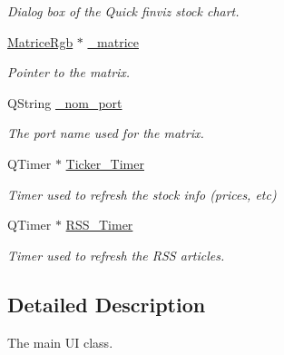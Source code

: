 \begin{DoxyCompactItemize}
\begin{DoxyCompactList}\small\item\em Dialog box of the Quick finviz stock chart. \end{DoxyCompactList}\item 
\hypertarget{class_t_k_r_t_a_p_a5cfe8b9a7354e3b2d2bf13380e1bca10}{\hyperlink{class_matrice_rgb}{Matrice\+Rgb} $\ast$ \hyperlink{class_t_k_r_t_a_p_a5cfe8b9a7354e3b2d2bf13380e1bca10}{\+\_\+matrice}}\label{class_t_k_r_t_a_p_a5cfe8b9a7354e3b2d2bf13380e1bca10}

\begin{DoxyCompactList}\small\item\em Pointer to the matrix. \end{DoxyCompactList}\item 
\hypertarget{class_t_k_r_t_a_p_a70b9df534de6fd98d382d19d2187c081}{Q\+String \hyperlink{class_t_k_r_t_a_p_a70b9df534de6fd98d382d19d2187c081}{\+\_\+nom\+\_\+port}}\label{class_t_k_r_t_a_p_a70b9df534de6fd98d382d19d2187c081}

\begin{DoxyCompactList}\small\item\em The port name used for the matrix. \end{DoxyCompactList}\item 
\hypertarget{class_t_k_r_t_a_p_afac0c2f9700ac220009573a74688f773}{Q\+Timer $\ast$ \hyperlink{class_t_k_r_t_a_p_afac0c2f9700ac220009573a74688f773}{Ticker\+\_\+\+Timer}}\label{class_t_k_r_t_a_p_afac0c2f9700ac220009573a74688f773}

\begin{DoxyCompactList}\small\item\em Timer used to refresh the stock info (prices, etc) \end{DoxyCompactList}\item 
\hypertarget{class_t_k_r_t_a_p_ab1d5dfc208843cd507a348086e862008}{Q\+Timer $\ast$ \hyperlink{class_t_k_r_t_a_p_ab1d5dfc208843cd507a348086e862008}{R\+S\+S\+\_\+\+Timer}}\label{class_t_k_r_t_a_p_ab1d5dfc208843cd507a348086e862008}

\begin{DoxyCompactList}\small\item\em Timer used to refresh the R\+S\+S articles. \end{DoxyCompactList}\end{DoxyCompactItemize}


\subsection{Detailed Description}
The main U\+I class. 

